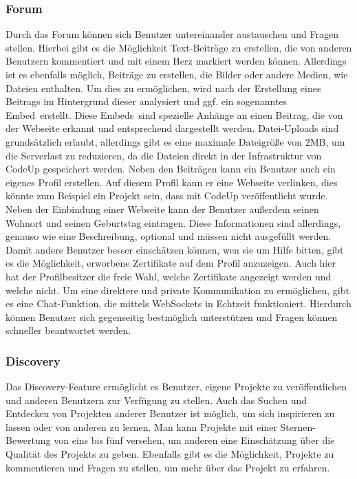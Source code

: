 \documentclass[main.tex]{subfiles}
\begin{document}
    \subsubsection{Forum}
    Durch das Forum können sich Benutzer untereinander austauschen und Fragen stellen.
    Hierbei gibt es die Möglichkeit Text-Beiträge zu erstellen, die von anderen Benutzern kommentiert und mit einem Herz markiert werden können.
    Allerdings ist es ebenfalls möglich, Beiträge zu erstellen, die Bilder oder andere Medien, wie Dateien enthalten.
    Um dies zu ermöglichen, wird nach der Erstellung eines Beitrags im Hintergrund dieser analysiert und ggf. ein sogenanntes \dq Embed\dq\ erstellt.
    Diese \dq Embeds\dq\ sind spezielle Anhänge an einen Beitrag, die von der Webseite erkannt und entsprechend dargestellt werden.
    Datei-Uploads sind grundsätzlich erlaubt, allerdings gibt es eine maximale Dateigröße von 2MB, um die Serverlast zu reduzieren, da die Dateien direkt in der Infrastruktur von CodeUp gespeichert werden.
    Neben den Beiträgen kann ein Benutzer auch ein eigenes Profil erstellen.
    Auf diesem Profil kann er eine Webseite verlinken, dies könnte zum Beispiel ein Projekt sein, dass mit CodeUp veröffentlicht wurde.
    Neben der Einbindung einer Webseite kann der Benutzer außerdem seinen Wohnort und seinen Geburtstag eintragen.
    Diese Informationen sind allerdings, genauso wie eine Beschreibung, optional und müssen nicht ausgefüllt werden.
    Damit andere Benutzer besser einschätzen können, wen sie um Hilfe bitten, gibt es die Möglichkeit, erworbene Zertifikate auf dem Profil anzuzeigen.
    Auch hier hat der Profilbesitzer die freie Wahl, welche Zertifikate angezeigt werden und welche nicht.
    Um eine direktere und private Kommunikation zu ermöglichen, gibt es eine Chat-Funktion, die mittels WebSockets in Echtzeit funktioniert.
    Hierdurch können Benutzer sich gegenseitig bestmöglich unterstützen und Fragen können schneller beantwortet werden.
    \subsubsection{Discovery}
    Das Discovery-Feature ermöglicht es Benutzer, eigene Projekte zu veröffentlichen und anderen Benutzern zur Verfügung zu stellen.
    Auch das Suchen und Entdecken von Projekten anderer Benutzer ist möglich, um sich inspirieren zu lassen oder von anderen zu lernen.
    Man kann Projekte mit einer Sternen-Bewertung von eins bis fünf versehen, um anderen eine Einschätzung über die Qualität des Projekts zu geben.
    Ebenfalls gibt es die Möglichkeit, Projekte zu kommentieren und Fragen zu stellen, um mehr über das Projekt zu erfahren.
\end{document}
